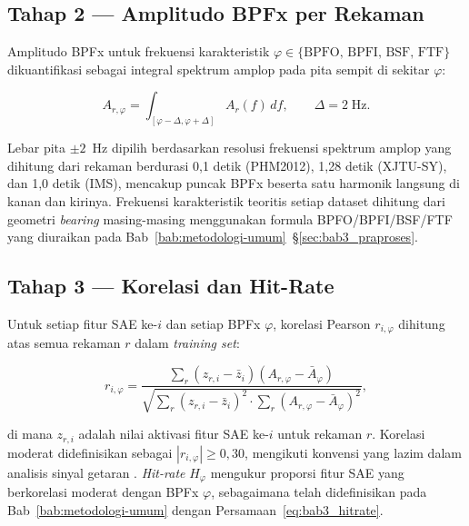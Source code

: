 \subsection*{Tahap 2 --- Amplitudo BPFx per Rekaman}

Amplitudo BPFx untuk frekuensi karakteristik $\varphi \in
\{\text{BPFO, BPFI, BSF, FTF}\}$ dikuantifikasi sebagai integral
spektrum amplop pada pita sempit di sekitar $\varphi$:

\begin{equation}\label{eq:bab5_bpfx_amplitude}
  A_{r,\varphi} = \int_{[\varphi - \Delta, \varphi + \Delta]} A_r(f)\, df,
  \qquad \Delta = 2\;\text{Hz}.
\end{equation}

\noindent Lebar pita $\pm 2$~Hz dipilih berdasarkan resolusi frekuensi
spektrum amplop yang dihitung dari rekaman berdurasi 0,1 detik (PHM2012),
{\color{blue}1,28 detik (XJTU-SY), dan 1,0 detik (IMS)}, mencakup puncak
BPFx beserta satu harmonik langsung di kanan dan kirinya.
Frekuensi karakteristik teoritis setiap dataset dihitung dari geometri
\emph{bearing} masing-masing menggunakan formula BPFO/BPFI/BSF/FTF yang
diuraikan pada Bab~\ref{bab:metodologi-umum}~§\ref{sec:bab3_praproses}.

\subsection*{Tahap 3 --- Korelasi dan Hit-Rate}

Untuk setiap fitur SAE ke-$i$ dan setiap BPFx $\varphi$, korelasi Pearson
$r_{i,\varphi}$ dihitung atas semua rekaman $r$ dalam \emph{training set}:

\begin{equation}\label{eq:bab5_pearson}
  r_{i,\varphi} = \frac{\sum_r (z_{r,i} - \bar{z}_i)(A_{r,\varphi} -
                  \bar{A}_\varphi)}
                 {\sqrt{\sum_r (z_{r,i} - \bar{z}_i)^2 \cdot
                  \sum_r (A_{r,\varphi} - \bar{A}_\varphi)^2}},
\end{equation}

\noindent di mana $z_{r,i}$ adalah nilai aktivasi fitur SAE ke-$i$ untuk
rekaman $r$.
Korelasi moderat didefinisikan sebagai $|r_{i,\varphi}| \geq 0{,}30$,
mengikuti konvensi yang lazim dalam analisis sinyal getaran
.
\emph{Hit-rate} $H_\varphi$ mengukur proporsi fitur SAE yang berkorelasi
moderat dengan BPFx $\varphi$, sebagaimana telah didefinisikan pada
Bab~\ref{bab:metodologi-umum} dengan Persamaan~\ref{eq:bab3_hitrate}.

